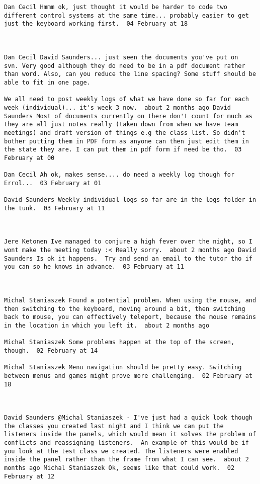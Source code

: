 \begin{verbatim}
Dan Cecil Hmmm ok, just thought it would be harder to code two
different control systems at the same time... probably easier to get
just the keyboard working first.  04 February at 18



Dan Cecil David Saunders... just seen the documents you've put on
svn. Very good although they do need to be in a pdf document rather
than word. Also, can you reduce the line spacing? Some stuff should be
able to fit in one page.

We all need to post weekly logs of what we have done so far for each
week (individual)... it's week 3 now.  about 2 months ago David
Saunders Most of documents currently on there don't count for much as
they are all just notes really (taken down from when we have team
meetings) and draft version of things e.g the class list. So didn't
bother putting them in PDF form as anyone can then just edit them in
the state they are. I can put them in pdf form if need be tho.  03
February at 00

Dan Cecil Ah ok, makes sense.... do need a weekly log though for
Errol...  03 February at 01

David Saunders Weekly individual logs so far are in the logs folder in
the tunk.  03 February at 11



Jere Ketonen Ive managed to conjure a high fever over the night, so I
wont make the meeting today :< Really sorry.  about 2 months ago David
Saunders Is ok it happens.  Try and send an email to the tutor tho if
you can so he knows in advance.  03 February at 11



Michal Staniaszek Found a potential problem. When using the mouse, and
then switching to the keyboard, moving around a bit, then switching
back to mouse, you can effectively teleport, because the mouse remains
in the location in which you left it.  about 2 months ago

Michal Staniaszek Some problems happen at the top of the screen,
though.  02 February at 14

Michal Staniaszek Menu navigation should be pretty easy. Switching
between menus and games might prove more challenging.  02 February at
18



David Saunders @Michal Staniaszek - I've just had a quick look though
the classes you created last night and I think we can put the
listeners inside the panels, which would mean it solves the problem of
conflicts and reassigning listeners.  An example of this would be if
you look at the test class we created. The listeners were enabled
inside the panel rather than the frame from what I can see.  about 2
months ago Michal Staniaszek Ok, seems like that could work.  02
February at 12


\end{verbatim}
